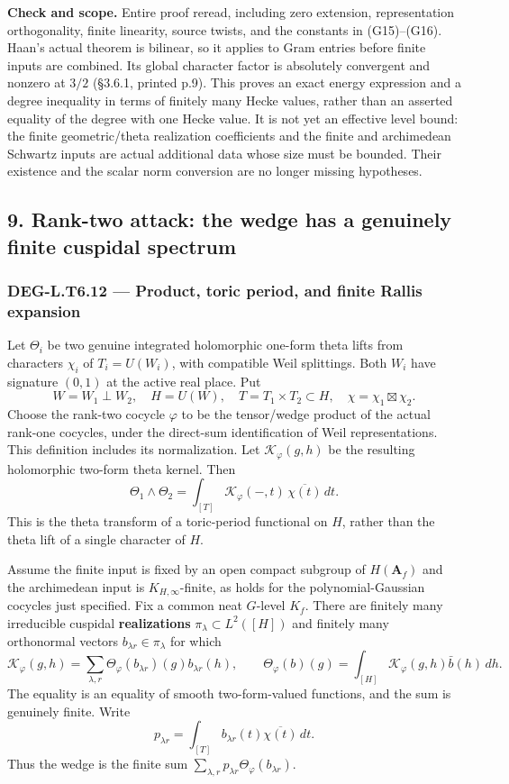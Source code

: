 \documentclass[11pt,a4paper]{article}
\theoremstyle{definition}
\begin{document}
\textbf{Check and scope.} Entire proof reread, including zero extension, representation orthogonality, finite linearity, source twists, and the constants in (G15)--(G16). Haan's actual theorem is bilinear, so it applies to Gram entries before finite inputs are combined. Its global character factor is absolutely convergent and nonzero at \(3/2\) (§3.6.1, printed p.9). This proves an exact energy expression and a degree inequality in terms of finitely many Hecke values, rather than an asserted equality of the degree with one Hecke value. It is not yet an effective level bound: the finite geometric/theta realization coefficients and the finite and archimedean Schwartz inputs are actual additional data whose size must be bounded. Their existence and the scalar norm conversion are no longer missing hypotheses.

\subsection{9. Rank-two attack: the wedge has a genuinely finite cuspidal spectrum}\label{rank-two-attack-the-wedge-has-a-genuinely-finite-cuspidal-spectrum}

\subsubsection{DEG-L.T6.12 --- Product, toric period, and finite Rallis expansion}\label{DEG-L.T6.12}

Let \(\Theta_i\) be two genuine integrated holomorphic one-form theta lifts from characters \(\chi_i\) of \(T_i=U(W_i)\), with compatible Weil splittings. Both \(W_i\) have signature \((0,1)\) at the active real place. Put \[
W=W_1\perp W_2,\quad H=U(W),\quad T=T_1\times T_2\subset H,\quad \chi=\chi_1\boxtimes\chi_2.
\] Choose the rank-two cocycle \(\varphi\) to be the tensor/wedge product of the actual rank-one cocycles, under the direct-sum identification of Weil representations. This definition includes its normalization. Let \(\mathcal K_\varphi(g,h)\) be the resulting holomorphic two-form theta kernel. Then \[
\Theta_1\wedge\Theta_2
=\int_{[T]}\mathcal K_\varphi(-,t)\,\overline{\chi(t)}\,dt.
\tag{G17}
\] This is the theta transform of a toric-period functional on \(H\), rather than the theta lift of a single character of \(H\).

Assume the finite input is fixed by an open compact subgroup of \(H(\mathbf A_f)\) and the archimedean input is \(K_{H,\infty}\)-finite, as holds for the polynomial-Gaussian cocycles just specified. Fix a common neat \(G\)-level \(K_f\). There are finitely many irreducible cuspidal \textbf{realizations} \(\pi_\lambda\subset L^2([H])\) and finitely many orthonormal vectors \(b_{\lambda r}\in\pi_\lambda\) for which \[
\mathcal K_\varphi(g,h)=
\sum_{\lambda,r}\Theta_\varphi(b_{\lambda r})(g)b_{\lambda r}(h),
\qquad
\Theta_\varphi(b)(g)=\int_{[H]}\mathcal K_\varphi(g,h)\bar b(h)\,dh.
\tag{G18}
\] The equality is an equality of smooth two-form-valued functions, and the sum is genuinely finite. Write \[
p_{\lambda r}=\int_{[T]}b_{\lambda r}(t)\overline{\chi(t)}\,dt.
\] Thus the wedge is the finite sum \(\sum_{\lambda,r}p_{\lambda r}\Theta_\varphi(b_{\lambda r})\).
\end{document}
